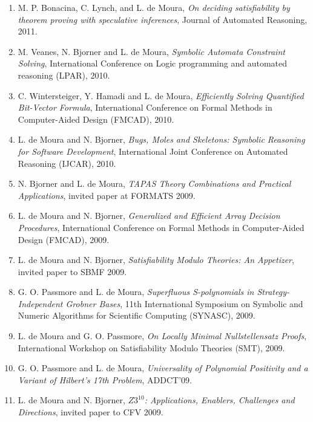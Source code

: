 \documentclass{article}
\begin{document}
\begin{enumerate}
\item M. P. Bonacina, C. Lynch, and L. de Moura,
      {\em On deciding satisfiability by theorem proving with speculative inferences},
Journal of Automated Reasoning, 2011.

\item M. Veanes, N. Bjorner and L. de Moura,
{\em Symbolic Automata Constraint Solving},
International Conference on Logic programming and automated reasoning (LPAR), 2010.

\item C. Wintersteiger, Y. Hamadi and L. de Moura,
{\em Efficiently Solving Quantified Bit-Vector Formula},
International Conference on Formal Methods in Computer-Aided Design (FMCAD), 2010.

\item L. de Moura and N. Bjorner,
{\em Bugs, Moles and Skeletons: Symbolic Reasoning for Software Development},
International Joint Conference on Automated Reasoning (IJCAR), 2010.

\item N. Bjorner and L. de Moura,
{\em TAPAS Theory Combinations and Practical Applications},
invited paper at FORMATS 2009.

\item L. de Moura and N. Bjorner,
{\em Generalized and Efficient Array Decision Procedures},
International Conference on Formal Methods in Computer-Aided Design (FMCAD), 2009.

\item L. de Moura and N. Bjorner,
{\em Satisfiability Modulo Theories: An Appetizer},
invited paper to SBMF 2009.

\item G. O. Passmore and L. de Moura,
{\em Superfluous S-polynomials in Strategy-Independent Grobner Bases},
11th International Symposium on Symbolic and Numeric Algorithms for Scientific Computing (SYNASC), 2009.

\item L. de Moura and G. O. Passmore,
{\em On Locally Minimal Nullstellensatz Proofs},
International Workshop on Satisfiability Modulo Theories (SMT), 2009.

\item G. O. Passmore and L. de Moura,
{\em Universality of Polynomial Positivity and a Variant of Hilbert's 17th Problem},
ADDCT'09.

\item L. de Moura and N. Bjorner,
{\em $Z3^{10}$: Applications, Enablers, Challenges and Directions},
invited paper to CFV 2009.


\end{enumerate}
\end{document}
